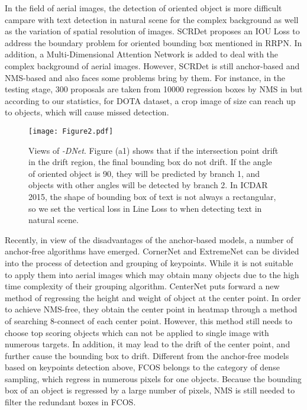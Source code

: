 \documentclass[runningheads]{llncs}
\begin{document}
In the field of aerial images, the detection of oriented object is more difficult campare with text detection in natural scene for the complex background as well as the variation of spatial resolution of images.  SCRDet\cite{yang2019scrdet} proposes an IOU Loss to address the boundary problem for oriented bounding box mentioned in RRPN. In addition, a Multi-Dimensional Attention Network is added to deal with the complex background of aerial images. However, SCRDet is still anchor-based and NMS-based and also faces some problems bring by them. For instance, in the testing stage, 300 proposals are taken from 10000 regression boxes by NMS in \cite{yang2019scrdet} but according to our statistics, for DOTA dataset, a crop image of  size can reach up to  objects, which will cause missed detection.


\begin{figure*}[t]
	\centering
	\texttt{[image: Figure2.pdf]}
\caption{Views of \textit{-DNet}. Figure (a1) shows that if the intersection point drift in the drift region, the final bounding box do not drift. If the angle of oriented object is 90, they will be predicted by branch 1, and objects with other angles will be detected by branch 2. In ICDAR 2015, the shape of bounding box of text is not always a rectangular, so we set the vertical loss in Line Loss to  when detecting text in natural scene.} 
	\label{Figure 2}
\end{figure*}


Recently, in view of the disadvantages of the anchor-based models, a number of anchor-free algorithms\cite{law2018cornernet,zhou2019bottom,tian2019fcos,zhou2019objects} have emerged. CornerNet\cite{law2018cornernet} and ExtremeNet\cite{zhou2019bottom} can be divided into the process of detection and grouping of keypoints. While it is not suitable to apply them into aerial images which may obtain many objects due to the high time complexity of their grouping algorithm.  CenterNet\cite{zhou2019objects} puts forward a new method of regressing the height and weight of object at the center point. In order to achieve NMS-free, they obtain the center point in heatmap through a method of searching 8-connect of each center point. However, this method still needs to choose  top scoring objects which can not be applied to single image with numerous targets. In addition, it may lead to the drift of the center point, and further cause the bounding box to drift. Different from the anchor-free models based on keypoints detection above, FCOS\cite{tian2019fcos} belongs to the category of dense sampling, which regress in numerous pixels for one objects. Because the bounding box of an object is regressed by a large number of pixels, NMS is still needed to filter the redundant boxes in FCOS.
\end{document}
